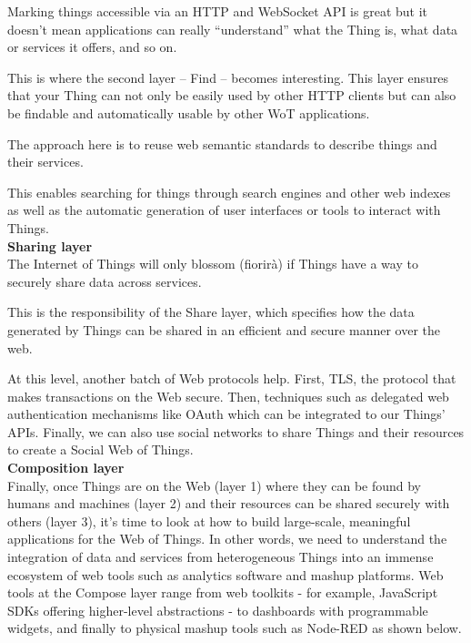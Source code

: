 Marking things accessible via an HTTP and WebSocket API is great but it doesn't
mean applications can really  ``understand'' what the Thing is, what data or
services it offers, and so on.

This is where the second layer – Find – becomes interesting.
This layer ensures that your Thing can not only be easily used by other HTTP
clients but can also be findable and automatically usable by other WoT
applications.

The approach here is to reuse web semantic standards to describe things and
their services.

This enables searching for things through search engines and other web indexes
as well as the automatic generation of user interfaces or tools to interact
with Things.\\

\textbf{Sharing layer}\\

The Internet of Things will only blossom (fiorirà) if Things have a way to
securely share data across services.

This is the responsibility of the Share layer, which specifies how the data
generated by Things can be shared in an efficient and secure manner over
the web.

At this level, another batch of Web protocols help.
First, TLS, the protocol that makes transactions on the Web secure.
Then, techniques such as delegated web authentication mechanisms like OAuth
which can be integrated to our Things' APIs. Finally, we can also use social
networks to share Things and their resources to create a Social Web of
Things.\\

\textbf{Composition layer}\\

Finally, once Things are on the Web (layer 1) where they can be found by humans
and machines (layer 2) and their resources can be shared securely with others
(layer 3), it's time to look at how to build large-scale, meaningful
applications for the Web of Things. In other words, we need to understand the
integration of data and services from heterogeneous Things into an immense
ecosystem of web tools such as analytics software and mashup platforms.
Web tools at the Compose layer range from web toolkits - for example,
JavaScript SDKs offering higher-level abstractions - to dashboards with
programmable widgets, and finally to physical mashup tools such as Node-RED as
shown below.

